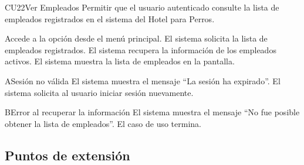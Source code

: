 ﻿%

\begin{UseCase}{CU22}{Ver Empleados}{
	Permitir que el usuario autenticado consulte la lista de empleados registrados en el sistema del Hotel para Perros.
}
\end{UseCase}

\begin{UCtrayectoria}
	\UCpaso[\UCactor] Accede a la opción  desde el menú principal.
	\UCpaso El sistema solicita la lista de empleados registrados.
	\UCpaso El sistema recupera la información de los empleados activos.
	\UCpaso El sistema muestra la lista de empleados en la pantalla.
\end{UCtrayectoria}

\begin{UCtrayectoriaA}{A}{Sesión no válida}
	\UCpaso El sistema muestra el mensaje ``La sesión ha expirado''.
	\UCpaso El sistema solicita al usuario iniciar sesión nuevamente.
\end{UCtrayectoriaA}

\begin{UCtrayectoriaA}{B}{Error al recuperar la información}
	\UCpaso El sistema muestra el mensaje ``No fue posible obtener la lista de empleados''.
	\UCpaso El caso de uso termina.
\end{UCtrayectoriaA}

\subsection{Puntos de extensión}

